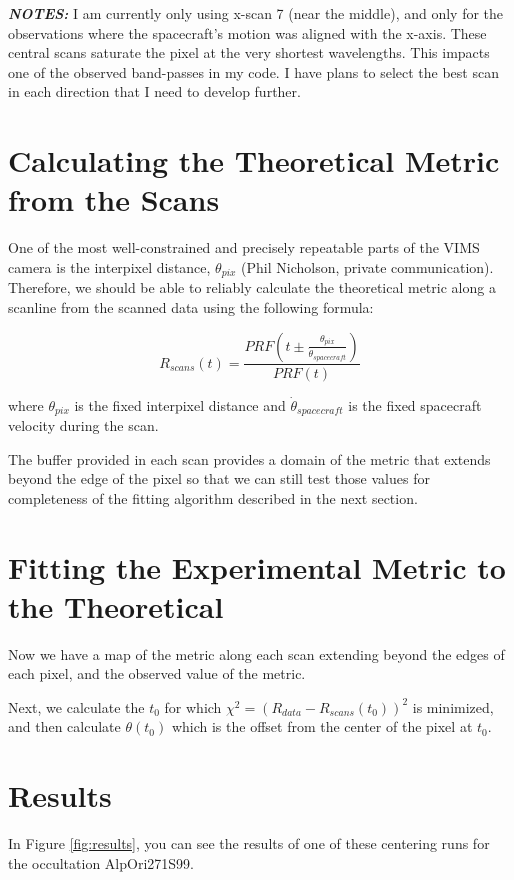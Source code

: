 \documentclass[12pt]{article}
\begin{document}
{\em \bf NOTES:} I am currently only using x-scan 7 (near the middle), and only
for the observations where the spacecraft's motion was aligned with the x-axis.
These central scans saturate the pixel at the very shortest wavelengths. This
impacts one of the observed band-passes in my code. I have plans to select the
best scan in each direction that I need to develop further.

\section{Calculating the Theoretical Metric from the Scans}

One of the most well-constrained and precisely repeatable parts of the VIMS
camera is the interpixel distance, $\theta_{pix}$ (Phil Nicholson, private
communication).  Therefore, we should be able to reliably calculate the
theoretical metric along a scanline from the scanned data using the following
formula:

\begin{equation}
  R_{scans}(t) = \frac{PRF(t\pm\frac{\theta_{pix}}{\dot\theta_{spacecraft}})}{PRF(t)}
\end{equation}

where $\theta_{pix}$ is the fixed interpixel distance and $\dot\theta_{spacecraft}$
is the fixed spacecraft velocity during the scan.

The buffer provided in each scan provides a domain of the metric that extends
beyond the edge of the pixel so that we can still test those values for
completeness of the fitting algorithm described in the next section.

\section{Fitting the Experimental Metric to the Theoretical}

Now we have a map of the metric along each scan extending beyond the edges of
each pixel, and the observed value of the metric.

Next, we calculate the $t_0$ for which $\chi^2 = (R_{data}-R_{scans}(t_0))^2$
is minimized, and then calculate $\theta(t_0)$ which is the offset from the
center of the pixel at $t_0$.

\section{Results}

In Figure \ref{fig:results}, you can see the results of one of these centering
runs for the occultation AlpOri271S99.
\end{document}
